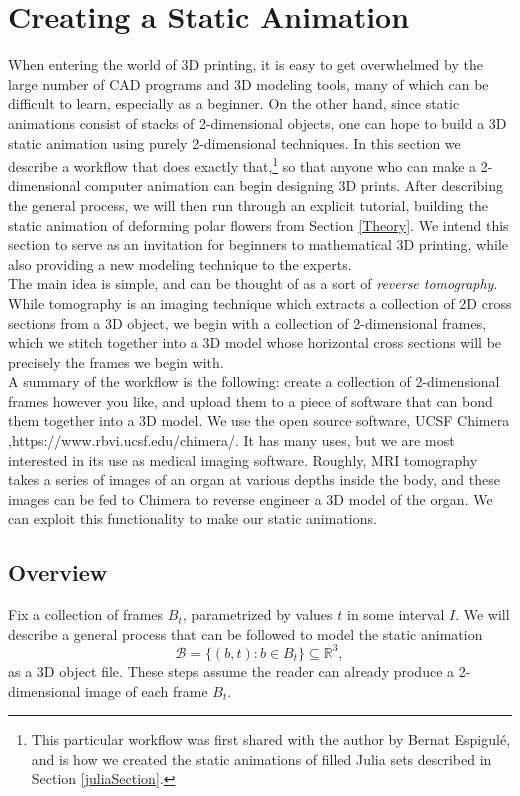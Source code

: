 \documentclass[12 pt]{article}
\newcommand{\bR}{\mathbb{R}}
\newcommand{\cB}{\mathcal{B}}
\begin{document}
\section{Creating a Static Animation}\label{How?}
When entering the world of 3D printing, it is easy to get overwhelmed by the large number of CAD programs and 3D modeling tools, many of which can be difficult to learn, especially as a beginner.  On the other hand, since static animations consist of stacks of 2-dimensional objects, one can hope to build a 3D static animation using purely 2-dimensional techniques.  In this section we describe a workflow that does exactly that,\footnote{This particular workflow was first shared with the author by Bernat Espigul\'e, and is how we created the static animations of filled Julia sets described in Section \ref{juliaSection}.} so that anyone who can make a 2-dimensional computer animation can begin designing 3D prints.  After describing the general process, we will then run through an explicit tutorial, building the static animation of deforming polar flowers from Section \ref{Theory}.  We intend this section to serve as an invitation for beginners to mathematical 3D printing, while also providing a new modeling technique to the experts.\\

The main idea is simple, and can be thought of as a sort of \textit{reverse tomography}.  While tomography is an imaging technique which extracts a collection of 2D cross sections from a 3D object, we begin with a collection of 2-dimensional frames, which we stitch together into a 3D model whose horizontal cross sections will be precisely the frames we begin with.\\

A summary of the workflow is the following: create a collection of 2-dimensional frames however you like, and upload them to a piece of software that can bond them together into a 3D model.  We use the open source software, UCSF Chimera \cite{chimera},https://www.rbvi.ucsf.edu/chimera/.  It has many uses, but we are most interested in its use as medical imaging software.  Roughly, MRI tomography takes a series of images of an organ at various depths inside the body, and these images can be fed to Chimera to reverse engineer a 3D model of the organ.  We can exploit this functionality to make our static animations.

\subsection{Overview}
Fix a collection of frames $B_t$, parametrized by values $t$ in some interval $I$.  We will describe a general process that can be followed to model the static animation
\[\cB = \{(b,t):b\in B_t\}\subseteq\bR^3,\]
as a 3D object file.  These steps assume the reader can already produce a 2-dimensional image of each frame $B_t$.
\end{document}

